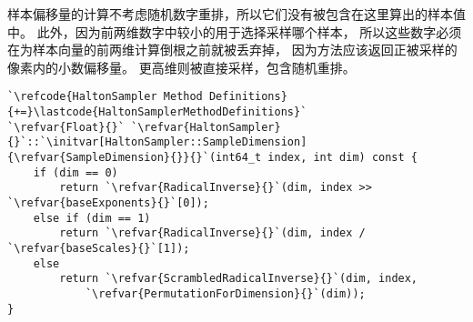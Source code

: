 样本偏移量的计算不考虑随机数字重排，所以它们没有被包含在这里算出的样本值中。
此外，因为前两维数字中较小的用于选择采样哪个样本，
所以这些数字必须在为样本向量的前两维计算倒根之前就被丢弃掉，
因为方法应该返回正被采样的像素内的小数偏移量。
更高维则被直接采样，包含随机重排。
\begin{lstlisting}
`\refcode{HaltonSampler Method Definitions}{+=}\lastcode{HaltonSamplerMethodDefinitions}`
`\refvar{Float}{}` `\refvar{HaltonSampler}{}`::`\initvar[HaltonSampler::SampleDimension]{\refvar{SampleDimension}{}}{}`(int64_t index, int dim) const {
    if (dim == 0)
        return `\refvar{RadicalInverse}{}`(dim, index >> `\refvar{baseExponents}{}`[0]);
    else if (dim == 1)
        return `\refvar{RadicalInverse}{}`(dim, index / `\refvar{baseScales}{}`[1]);
    else
        return `\refvar{ScrambledRadicalInverse}{}`(dim, index,
            `\refvar{PermutationForDimension}{}`(dim));
}
\end{lstlisting}